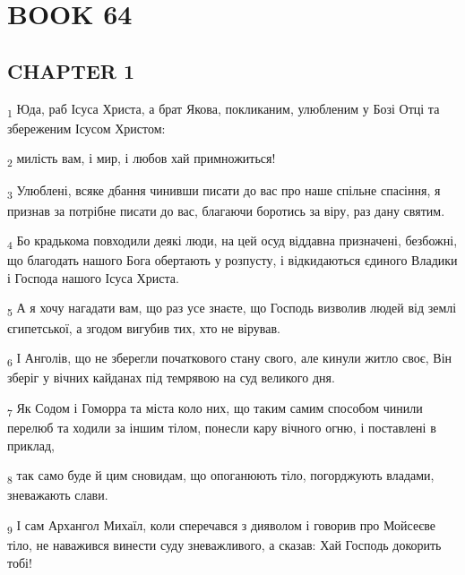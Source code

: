 \section{BOOK 64}
\subsection{CHAPTER 1}
\begin{tcolorbox}
\textsubscript{1} Юда, раб Ісуса Христа, а брат Якова, покликаним, улюбленим у Бозі Отці та збереженим Ісусом Христом:
\end{tcolorbox}
\begin{tcolorbox}
\textsubscript{2} милість вам, і мир, і любов хай примножиться!
\end{tcolorbox}
\begin{tcolorbox}
\textsubscript{3} Улюблені, всяке дбання чинивши писати до вас про наше спільне спасіння, я признав за потрібне писати до вас, благаючи боротись за віру, раз дану святим.
\end{tcolorbox}
\begin{tcolorbox}
\textsubscript{4} Бо крадькома повходили деякі люди, на цей осуд віддавна призначені, безбожні, що благодать нашого Бога обертають у розпусту, і відкидаються єдиного Владики і Господа нашого Ісуса Христа.
\end{tcolorbox}
\begin{tcolorbox}
\textsubscript{5} А я хочу нагадати вам, що раз усе знаєте, що Господь визволив людей від землі єгипетської, а згодом вигубив тих, хто не вірував.
\end{tcolorbox}
\begin{tcolorbox}
\textsubscript{6} І Анголів, що не зберегли початкового стану свого, але кинули житло своє, Він зберіг у вічних кайданах під темрявою на суд великого дня.
\end{tcolorbox}
\begin{tcolorbox}
\textsubscript{7} Як Содом і Гоморра та міста коло них, що таким самим способом чинили перелюб та ходили за іншим тілом, понесли кару вічного огню, і поставлені в приклад,
\end{tcolorbox}
\begin{tcolorbox}
\textsubscript{8} так само буде й цим сновидам, що опоганюють тіло, погорджують владами, зневажають слави.
\end{tcolorbox}
\begin{tcolorbox}
\textsubscript{9} І сам Архангол Михаїл, коли сперечався з дияволом і говорив про Мойсеєве тіло, не наважився винести суду зневажливого, а сказав: Хай Господь докорить тобі!
\end{tcolorbox}
